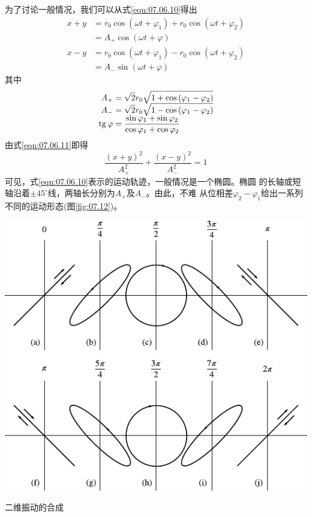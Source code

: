 为了讨论一般情况，我们可以从式\eqref{eqn:07.06.10}得出
\begin{equation}\label{eqn:07.06.11}
  \begin{split}
    x + y &= r _ { 0 }  \cos \left( \omega t + \varphi _ { 1 } \right) + r _ { 0 }  \cos \left( \omega t +  \varphi _ { 2 } \right)  \\[-0.5em]
    &= A _ { + }  \cos \left( \omega t + \varphi \right) \\[-0.5em]
    x - y &= r _ { 0 }  \cos \left( \omega t +  \varphi _ { 1 } \right) - r _ { 0 }  \cos \left( \omega t +  \varphi _ { 2 } \right)  \\[-0.5em]
    &= A _ { - }  \sin \left( \omega t + \varphi \right)
  \end{split}
\end{equation}
其中\vspace{-1.56em}
\begin{equation}\label{eqn:07.06.12}
  \begin{split}
    A _ { + } &= \sqrt { 2 } r _ { 0 } \sqrt { 1 + \cos \left( \varphi _ { 1 } -  \varphi _ { 2 } \right) }  \\[-0.5em]
    A _ { - } &= \sqrt { 2 } r _ { 0 } \sqrt { 1 - \cos \left( \varphi _ { 1 } -  \varphi _ { 2 } \right) } \\[-0.5em]
    \operatorname{tg} \varphi &= \frac { \sin \varphi _ { 1 } + \sin \varphi _ { 2 } } { \cos \varphi _ { 1 } + \cos \varphi _ { 2 } }
  \end{split}
\end{equation}
由式\eqref{eqn:07.06.11}即得
\begin{equation*}
  \frac { \left( x + y \right) ^ { 2 } } { A _ { + } ^ { 2 } } + \frac { \left( x - y \right) ^ { 2 } } { A _ { - } ^ { 2 } } = 1
\end{equation*}
可见，式\eqref{eqn:07.06.10}表示的运动轨迹，一般情况是一个椭圆。椭圆
的长轴或短轴沿着$ \pm 45 ^ { \circ } $线，两轴长分别为$ A _ { + } $及$ A _ { - } $。由此，不难
从位相差$ \varphi_{ 2 } - \varphi_{ 1 } $给出一系列不同的运动形态(图\ref{fig:07.12})。\vspace{1.56em}
\begin{figurex}
  \centering
  \includegraphics{figure/fig07.12}
  \caption{二维振动的合成}
  \label{fig:07.12}
\end{figurex}
